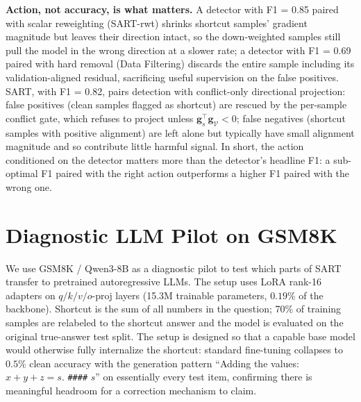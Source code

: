 \textbf{Action, not accuracy, is what matters.} A detector with F1 = 0.85 paired with scalar reweighting (SART-rwt) shrinks shortcut samples' gradient magnitude but leaves their direction intact, so the down-weighted samples still pull the model in the wrong direction at a slower rate; a detector with F1 = 0.69 paired with hard removal (Data Filtering) discards the entire sample including its validation-aligned residual, sacrificing useful supervision on the false positives. SART, with F1 = 0.82, pairs detection with conflict-only directional projection: false positives (clean samples flagged as shortcut) are rescued by the per-sample conflict gate, which refuses to project unless $\mathbf{g}_s^\top \mathbf{g}_{\mathcal{V}} < 0$; false negatives (shortcut samples with positive alignment) are left alone but typically have small alignment magnitude and so contribute little harmful signal. In short, the action conditioned on the detector matters more than the detector's headline F1: a sub-optimal F1 paired with the right action outperforms a higher F1 paired with the wrong one.

\section{Diagnostic LLM Pilot on GSM8K}
\label{sec:appendix_llm_transfer}

We use GSM8K / Qwen3-8B as a diagnostic pilot to test which parts of SART transfer to pretrained autoregressive LLMs. The setup uses LoRA rank-16 adapters on $q/k/v/o\text{-proj}$ layers (15.3M trainable parameters, $0.19\%$ of the backbone). Shortcut is the sum of all numbers in the question; 70\% of training samples are relabeled to the shortcut answer and the model is evaluated on the original true-answer test split. The setup is designed so that a capable base model would otherwise fully internalize the shortcut: standard fine-tuning collapses to $0.5\%$ clean accuracy with the generation pattern ``Adding the values: $x{+}y{+}z = s$. \texttt{\#\#\#\#} $s$'' on essentially every test item, confirming there is meaningful headroom for a correction mechanism to claim.

